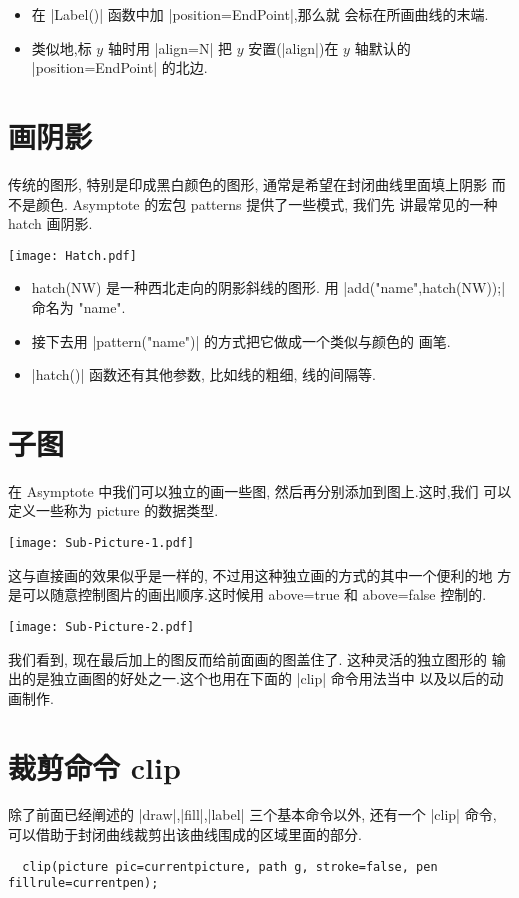 \documentclass{ctexbook}
\begin{document}
\begin{itemize}
\item 在 |Label()| 函数中加 |position=EndPoint|,那么就
  会标在所画曲线的末端.
\item  类似地,标 $y$ 轴时用 |align=N| 把 $y$ 安置(|align|)在 $y$ 轴默认的
  |position=EndPoint| 的北边.
\end{itemize}

\section{画阴影}
传统的图形, 特别是印成黑白颜色的图形, 通常是希望在封闭曲线里面填上阴影
而不是颜色. Asymptote 的宏包 {patterns} 提供了一些模式, 我们先
讲最常见的一种 hatch 画阴影. 
\begin{center}\texttt{[image: Hatch.pdf]}\end{center}%

\begin{itemize}
\item {hatch(NW)} 是一种西北走向的阴影斜线的图形. 用
  |add("name",hatch(NW));| 命名为 "name". 
\item 接下去用 |pattern("name")| 的方式把它做成一个类似与颜色的
  画笔.
\item |hatch()| 函数还有其他参数, 比如线的粗细, 线的间隔等.
\end{itemize}

\section{子图}
在 Asymptote 中我们可以独立的画一些图, 然后再分别添加到图上.这时,我们
可以定义一些称为 {picture} 的数据类型.
\begin{center}\texttt{[image: Sub-Picture-1.pdf]}\end{center}%


这与直接画的效果似乎是一样的, 不过用这种独立画的方式的其中一个便利的地
方是可以随意控制图片的画出顺序.这时候用 {above=true} 和 {above=false}
控制的. 
\begin{center}\texttt{[image: Sub-Picture-2.pdf]}\end{center}%


我们看到, 现在最后加上的图反而给前面画的图盖住了. 这种灵活的独立图形的
输出的是独立画图的好处之一.这个也用在下面的 |clip| 命令用法当中
以及以后的动画制作.

\section{裁剪命令 clip}
除了前面已经阐述的 |draw|,|fill|,|label| 三个基本命令以外, 还有一个
|clip| 命令, 可以借助于封闭曲线裁剪出该曲线围成的区域里面的部分.
\begin{lstlisting}
  clip(picture pic=currentpicture, path g, stroke=false, pen fillrule=currentpen);
\end{lstlisting}
\end{document}
